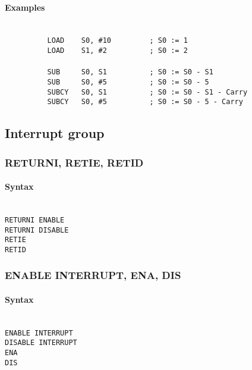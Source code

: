             \paragraph{Examples}
                ~\\
                \verb'          LOAD    S0, #10         ; S0 := 1'\\
                \verb'          LOAD    S1, #2          ; S0 := 2'\\
                \verb''\\
                \verb'          SUB     S0, S1          ; S0 := S0 - S1'\\
                \verb'          SUB     S0, #5          ; S0 := S0 - 5'\\
                \verb'          SUBCY   S0, S1          ; S0 := S0 - S1 - Carry'\\
                \verb'          SUBCY   S0, #5          ; S0 := S0 - 5 - Carry'

    \subsection{Interrupt group}
        \subsubsection{RETURNI, RETIE, RETID}
            \paragraph{Syntax}
                ~\\
                \verb'RETURNI ENABLE'\\
                \verb'RETURNI DISABLE'\\
                \verb'RETIE'\\
                \verb'RETID'

        \subsubsection{ENABLE INTERRUPT, ENA, DIS}
            \paragraph{Syntax}
                ~\\
                \verb'ENABLE INTERRUPT'\\
                \verb'DISABLE INTERRUPT'\\
                \verb'ENA'\\
                \verb'DIS'

